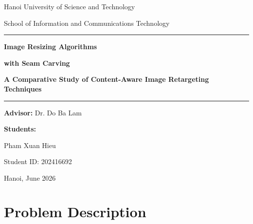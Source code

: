 \documentclass[12pt,a4paper]{article}
\begin{document}
\begin{titlepage}
    \centering
    \vspace*{2cm}
    {\Large Hanoi University of Science and Technology\par}
    \vspace{0.5cm}
    {\large School of Information and Communications Technology\par}
    \vspace{2cm}
    \rule{\textwidth}{0.5pt}\par
    \vspace{0.5cm}
    {\Huge\bfseries Image Resizing Algorithms\par}
    {\Huge\bfseries with Seam Carving\par}
    \vspace{0.3cm}
    {\large\bfseries A Comparative Study of Content-Aware Image Retargeting Techniques\par}
    \vspace{0.5cm}
    \rule{\textwidth}{0.5pt}\par
    \vspace{2cm}
    {\large\textbf{Advisor:} Dr. Do Ba Lam\par}
    \vspace{1cm}
    {\large\textbf{Students:}\par}
    \vspace{0.2cm}
    {\large Pham Xuan Hieu\par}
    {\large Student ID: 202416692\par}
    \vspace{2cm}
    {\large Hanoi, June 2026\par}
\end{titlepage}

\newpage
\tableofcontents
\newpage

\section{Problem Description}
\end{document}
